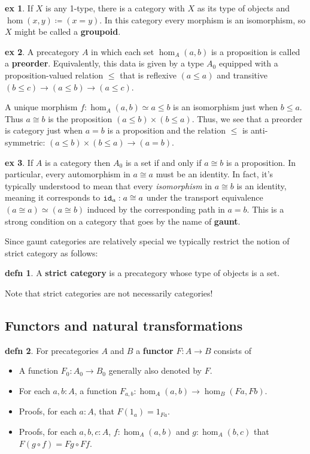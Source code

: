 \documentclass{amsart}
\theoremstyle{theorem}
\theoremstyle{definition}
\newtheorem*{defn}{defn}
\newtheorem*{ex}{ex}
\theoremstyle{remark}
\newcommand{\0}{\mathbbe{0}}
\newcommand{\1}{\mathbbe{1}}
\newcommand{\2}{\mathbbe{2}}
\newcommand{\3}{\mathbbe{3}}
\newcommand{\4}{\mathbbe{4}}
\newcommand{\term}[1]{{\textup{\texttt{#1}}}}
\newcommand{\id}{\term{id}}
\begin{document}
\begin{ex} If $X$ is any 1-type, there is a category with $X$ as its type of objects and $\hom(x,y) \coloneq (x=y)$. In this category every morphism is an isomorphism, so $X$ might be called a \textbf{groupoid}. 
\end{ex}

\begin{ex} A precategory $A$ in which each set $\hom_A(a,b)$ is a proposition is called a \textbf{preorder}. Equivalently, this data is given by a type $A_0$ equipped with a proposition-valued relation $\leq$ that is reflexive $(a \leq a)$ and transitive $(b\leq c) \to (a \leq b) \to (a \leq c)$.

A unique morphism $f : \hom_A(a,b) \simeq a \leq b$ is an isomorphism just when $b \leq a$. Thus $a \cong b$ is the proposition $(a \leq b) \times (b \leq a)$. Thus, we see that a preorder is category just when $a=b$ is a proposition and the relation $\leq$ is anti-symmetric: $(a \leq b) \times (b \leq a) \to (a=b)$.
\end{ex}

\begin{ex} If $A$ is a category then $A_0$ is a set if and only if $a \cong b$ is a proposition. In particular, every automorphism in $a \cong a$ must be an identity. In fact, it's typically understood to mean that every \emph{isomorphism} in $a \cong b$ is an identity, meaning it corresponds to $\id_a : a \cong a$ under the transport equivalence $(a \cong a) \simeq (a \cong b)$ induced by the corresponding path in $a =b$. This is a strong condition on a category that goes by the name of \textbf{gaunt}.
\end{ex}

\ifmine
Since gaunt categories are relatively special we typically restrict the notion of strict category as follows:

\begin{defn} A \textbf{strict category} is a precategory whose type of objects is a set.
\end{defn}

Note that strict categories are not necessarily categories!
\fi

\subsection*{Functors and natural transformations}

\begin{defn} For precategories $A$ and $B$ a \textbf{functor} $F \colon A \to B$ consists of
\begin{itemize}
\item A function $F_0 : A_0 \to B_0$ generally also denoted by $F$.
\item For each $a,b :A$, a function $F_{a,b} : \hom_A(a,b) \to \hom_B(Fa,Fb)$.
\item Proofs, for each $a :A$, that $F(1_a) = 1_{Fa}$.
\item Proofs, for each $a,b, c:A$, $f: \hom_A(a,b)$ and $g: \hom_A(b,c)$ that $F(g \circ f) = Fg \circ Ff$.
\end{itemize}
\end{defn}
\end{document}
